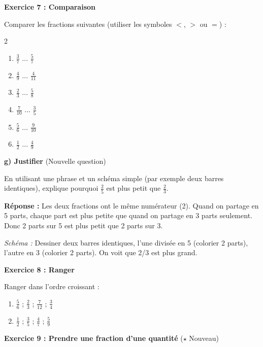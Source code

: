 \begin{exercisebox}
	
	
	\textbf{Exercice 7 : Comparaison}
	
	Comparer les fractions suivantes (utiliser les symboles $<$, $>$ ou $=$) :
	\begin{multicols}{2}
		\begin{enumerate}[label=\alph*)]
			\item $\frac{3}{7}$ \quad ... \quad $\frac{5}{7}$
			\item $\frac{4}{9}$ \quad ... \quad $\frac{4}{11}$
			\item $\frac{2}{3}$ \quad ... \quad $\frac{5}{8}$
			\item $\frac{7}{10}$ \quad ... \quad $\frac{3}{5}$
			\item $\frac{5}{6}$ \quad ... \quad $\frac{9}{10}$
			\item $\frac{1}{2}$ \quad ... \quad $\frac{4}{9}$
		\end{enumerate}
	\end{multicols}

	\medskip

	\textbf{g) Justifier} (Nouvelle question)

	En utilisant une phrase et un schéma simple (par exemple deux barres identiques), explique pourquoi $\frac{2}{5}$ est plus petit que $\frac{2}{3}$.

	\medskip

	\ifcorrige
	{\color{mainBlue}
	\textbf{Réponse :} Les deux fractions ont le même numérateur (2). Quand on partage en 5 parts, chaque part est plus petite que quand on partage en 3 parts seulement. Donc 2 parts sur 5 est plus petit que 2 parts sur 3.

	\textit{Schéma :} Dessiner deux barres identiques, l'une divisée en 5 (colorier 2 parts), l'autre en 3 (colorier 2 parts). On voit que 2/3 est plus grand.
	}
	\else
	\makebox[\textwidth]{\rule{0pt}{5cm}\dotfill}
	\fi

	\textbf{Exercice 8 : Ranger}
	
	Ranger dans l'ordre croissant :
	\begin{enumerate}[label=\alph*)]
		\item $\frac{5}{6}$ ; $\frac{2}{3}$ ; $\frac{7}{12}$ ; $\frac{3}{4}$
		\item $\frac{1}{2}$ ; $\frac{3}{5}$ ; $\frac{4}{7}$ ; $\frac{5}{9}$
	\end{enumerate}
	
	\textbf{Exercice 9 : Prendre une fraction d'une quantité} ($\star$ Nouveau)
	

\end{exercisebox}
